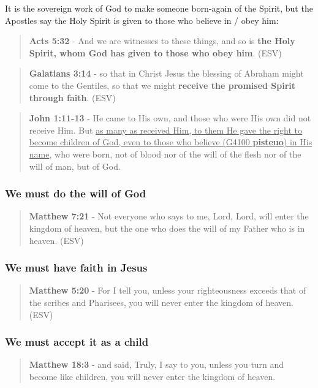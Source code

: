 \documentclass[11pt]{article}
\begin{document}
It is the sovereign work of God to make someone born-again of the Spirit, but the Apostles say the Holy Spirit is given to those who believe in / obey him:

\begin{quote}
\textbf{Acts 5:32} - And we are witnesses to these things, and so is \textbf{the Holy Spirit, whom God has given to those who obey him}. (ESV)
\end{quote}

\begin{quote}
\textbf{Galatians 3:14} - so that in Christ Jesus the blessing of Abraham might come to the Gentiles, so that we might \textbf{receive the promised Spirit through faith}. (ESV)
\end{quote}

\begin{quote}
\textbf{John 1:11-13} - He came to His own, and those who were His own did not receive Him. But \uline{as many as received Him, to them He gave the right to become children of God, even to those who believe (G4100 \textbf{pisteuo}) in His name}, who were born, not of blood nor of the will of the flesh nor of the will of man, but of God.
\end{quote}

\subsubsection{We must do the will of God}
\label{sec:orgd7f1afe}
\begin{quote}
\textbf{Matthew 7:21} - Not everyone who says to me, Lord, Lord, will enter the kingdom of heaven, but the one who does the will of my Father who is in heaven. (ESV)
\end{quote}

\subsubsection{We must have faith in Jesus}
\label{sec:orgb202258}
\begin{quote}
\textbf{Matthew 5:20} - For I tell you, unless your righteousness exceeds that of the scribes and Pharisees, you will never enter the kingdom of heaven. (ESV)
\end{quote}

\subsubsection{We must accept it as a child}
\label{sec:orgc578e26}
\begin{quote}
\textbf{Matthew 18:3} - and said, Truly, I say to you, unless you turn and become like children, you will never enter the kingdom of heaven.
\end{quote}
\end{document}
